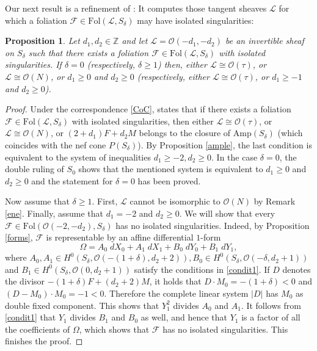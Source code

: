 \documentclass{amsart} %
\newtheorem{proposition}[theorem]{Proposition}
\theoremstyle{definition}
\newcommand{\cts}{\Theta_{S_{\delta}}}
\newcommand{\cs}{S_{\delta}}
\newcommand{\mcL}{\mathcal{L}}
\newcommand{\mcO}{\mathcal{O}}
\newcommand{\mcF}{\mathcal{F}}
\begin{document}
Our next result is a refinement of \cite[Proposition 2.2]{Gomez-Mont}: It computes those tangent sheaves $ \mcL $ for which a foliation $ \mcF \in \mathrm{Fol}( \mcL, \cs ) $
 may have isolated singularities:
\begin{proposition}\label{isolated}
Let $d_1,d_2\in \mathbb{Z}$ and let $\mathcal L=\mcO(-d_1,-d_2)$ be an invertible sheaf on $S_{\delta}$
 such that there exists a foliation $ \mcF \in \mathrm{Fol}( \mcL, \cs ) $
 with isolated singularities. If $ \delta=0 $ (respectively, $ \delta\geq 1 $) then, either
 $\mcL\cong \mcO(\tau)$, or $\mcL\cong \mcO(N)$, or $d_1\geq 0$ and $d_2\geq 0$ (respectively, either
 $ \mcL\cong \mcO(\tau) $,  or $d_1\geq -1$ and $d_2\geq 0$).
\end{proposition}
\begin{proof}
Under the correspondence \eqref{CoC}, \cite[Proposition 2.2]{Gomez-Mont}
 states that if there exists a foliation $ \mcF \in \textrm{Fol}( \mcL, \cs ) $
 with isolated singularities, then
 either $ \mcL\cong \mcO(\tau) $, or $\mcL\cong \mcO(N)$, or $ (2+d_1) F + d_2 M $ belongs to the
 closure of Amp$(\cs)$ (which coincides with the nef cone $P(\cs)$). By Proposition \ref{ample}, the
 last condition is equivalent to the system of inequalities $d_1\geq -2, d_2\geq 0$. In the case $\delta=0$,
 the double ruling of $S_0$ shows that the mentioned system is equivalent to $d_1\geq 0$ and $d_2\geq 0$ and the statement for $ \delta = 0 $ has been proved.

Now assume that $\delta\geq 1$. First, $ \mcL $ cannot be isomorphic to $ \mcO(N) $ by Remark \ref{ene}.
Finally, assume that $d_1=-2$ and $d_2\geq 0$. We will show that every
$ \mcF \in \textrm{Fol}( \mcO(-2, -d_2), \cs ) $ has no isolated singularities. Indeed,
 by Proposition \ref{forms}, $\mathcal F$ is representable by an affine differential $1$-form
 $$
  \Omega = A_0\;dX_0+A_1\; dX_1+B_0\; dY_0+ B_1\;dY_1,
 $$
 where $ A_0, A_1 \in H^0( \cs, \mcO(-(1+\delta),d_2+2) ), B_0 \in H^0( \cs, \mcO(-\delta,d_2+1) ) $
 and
 $ B_1 \in H^0( \cs, \mcO(0,d_2+1) ) $ satisfy the conditions in \eqref{condit1}. If $D$ denotes the divisor $ -(1+\delta)F+(d_2+2)M $, it holds that $ D\cdot M_0=-(1+\delta) < 0 $
and $ (D-M_0)\cdot M_0 = -1 < 0 $. Therefore the complete linear system $|D|$ has $M_0$ as double fixed
component. This shows that $Y_1^2$ divides $A_0$ and $A_1$. It follows from \eqref{condit1} that $Y_1$
divides $B_1$ and $B_0$ as well, and hence that $ Y_1 $ is a factor of all the coefficients of $ \Omega $, which shows that $ \mcF $ has no isolated singularities. This finishes the proof.
\end{proof}
\end{document}
